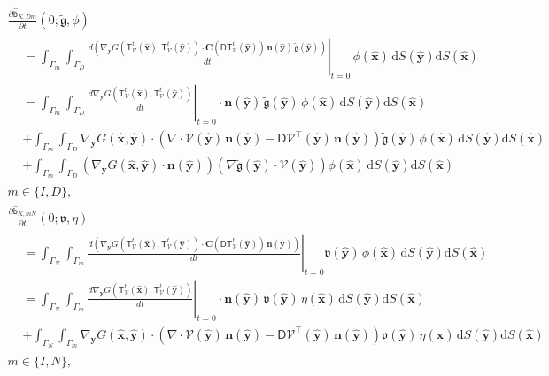 \documentclass{article}
\theoremstyle{remark}
\newcommand{\T}{\mathsf{T}}
\newcommand{\bbb}{\mathsf{b}}
\newcommand{\hatb}{\widehat{\bbb}}
\newcommand{\dd}{\mathrm{d}}
\newcommand{\n}{\boldsymbol{n}}
\newcommand{\hatx}{\widehat{\boldsymbol{x}}}
\newcommand{\haty}{\widehat{\boldsymbol{y}}}
\newcommand{\argv}{\mathfrak{v}}
\newcommand{\argg}{\mathfrak{g}}
\newcommand{\tildeg}{\widetilde{\argg}}
\newcommand{\mat}[1]{\mathbf{#1}}
\newcommand{\Nu}{\mathcal{V}}
\newcommand{\DNu}{\mathsf{D}\Nu}
\newcommand{\Tt}{\T_\Nu^t}
\newcommand{\DTt}{\mathsf{DT}_\Nu^t}
\newcommand{\CDTt}[1]{\mat{C}(\DTt({#1}))}
\begin{document}
\begin{multline*}
    \frac{\partial\hatb_{K,Dm}}{\partial t}(0;\tildeg,\phi)\\
    \begin{aligned}
    &=\int_{\Gamma_m}\int_{\Gamma_D}\left.\frac{d\left(\nabla_{\boldsymbol y}G(\Tt(\hatx),\Tt(\haty))\cdot\CDTt{\haty}\,\n(\haty)\,\tildeg(\haty)\right)}{dt}\right|_{t=0}\,\phi(\hatx)\,\dd S(\haty)\dd S(\hatx)\\
    &=\int_{\Gamma_m}\int_{\Gamma_D}\left.\frac{d\nabla_{\boldsymbol y}G(\Tt(\hatx),\Tt(\haty))}{dt}\right|_{t=0}\cdot\n(\haty)\,\tildeg(\haty)\,\phi(\hatx)\,\dd S(\haty)\dd S(\hatx)\\
    &+\int_{\Gamma_m}\int_{\Gamma_D}\nabla_{\boldsymbol y}G(\hatx,\haty)\cdot\left(\nabla\cdot\Nu(\haty)\,\n(\haty)-\DNu^\top(\haty)\,\n(\haty)\right)\tildeg(\haty)\,\phi(\hatx)\,\dd S(\haty)\dd S(\hatx)\\
    &+\int_{\Gamma_m}\int_{\Gamma_D}\left(\nabla_{\boldsymbol y}G(\hatx,\haty)\cdot\n(\haty)\right)\left(\nabla\tildeg(\haty)\cdot\Nu(\haty)\right)\phi(\hatx)\,\dd S(\haty)\dd S(\hatx)
    \end{aligned}\\
    m\in\{I,D\},
\end{multline*}
\begin{multline*}
    \frac{\partial\hatb_{K,mN}}{\partial t}(0;\argv,\eta)\\
    \begin{aligned}
    &=\int_{\Gamma_N}\int_{\Gamma_m}\left.\frac{d\left(\nabla_{\boldsymbol y}G(\Tt(\hatx),\Tt(\haty))\cdot\CDTt{\haty}\,\n(\haty)\right)}{dt}\right|_{t=0}\argv(\haty)\,\phi(\hatx)\,\dd S(\haty)\dd S(\hatx)\\
    &=\int_{\Gamma_N}\int_{\Gamma_m}\left.\frac{d\nabla_{\boldsymbol y}G(\Tt(\hatx),\Tt(\haty))}{dt}\right|_{t=0}\cdot\n(\haty)\,\argv(\haty)\,\eta(\hatx)\,\dd S(\haty)\dd S(\hatx)\\
    &+\int_{\Gamma_N}\int_{\Gamma_m}\nabla_{\boldsymbol y}G(\hatx,\haty)\cdot\left(\nabla\cdot\Nu(\haty)\,\n(\haty)-\DNu^\top(\haty)\,\n(\haty)\right)\argv(\haty)\,\eta(\hatx)\,\dd S(\haty)\dd S(\hatx)
    \end{aligned}\\
    m\in\{I,N\},
\end{multline*}
\end{document}
